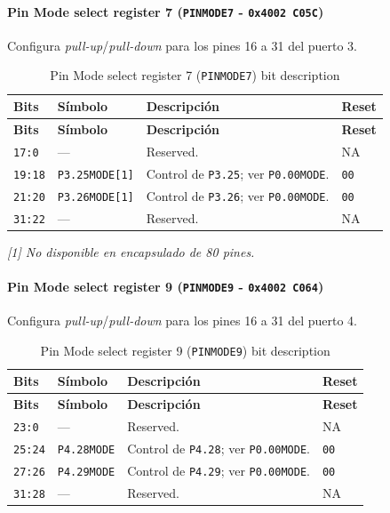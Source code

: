 \paragraph{Pin Mode select register 7 (\texttt{PINMODE7} - \texttt{0x4002 C05C})}
Configura \textit{pull-up}/\textit{pull-down} para los pines 16 a 31 del puerto 3.

\begin{longtable}{|>{\raggedright\arraybackslash}p{}|>{\raggedright\arraybackslash}p{}|>{\raggedright\arraybackslash}p{}|>{\centering\arraybackslash}p{}|}
\caption{Pin Mode select register 7 (\texttt{PINMODE7}) bit description}\\
\hline
\textbf{Bits} & \textbf{Símbolo} & \textbf{Descripción} & \textbf{Reset} \\
\hline
\endfirsthead
\hline
\textbf{Bits} & \textbf{Símbolo} & \textbf{Descripción} & \textbf{Reset} \\
\hline
\endhead
\texttt{17:0} & --- & Reserved. & NA \\
\hline
\texttt{19:18} & \texttt{P3.25MODE[1]} & Control de \texttt{P3.25}; ver \texttt{P0.00MODE}. & \texttt{00} \\
\hline
\texttt{21:20} & \texttt{P3.26MODE[1]} & Control de \texttt{P3.26}; ver \texttt{P0.00MODE}. & \texttt{00} \\
\hline
\texttt{31:22} & --- & Reserved. & NA \\
\hline
\end{longtable}
\noindent\textit{[1] No disponible en encapsulado de 80 pines.}

\paragraph{Pin Mode select register 9 (\texttt{PINMODE9} - \texttt{0x4002 C064})}
Configura \textit{pull-up}/\textit{pull-down} para los pines 16 a 31 del puerto 4.

\begin{longtable}{|>{\raggedright\arraybackslash}p{}|>{\raggedright\arraybackslash}p{}|>{\raggedright\arraybackslash}p{}|>{\centering\arraybackslash}p{}|}
\caption{Pin Mode select register 9 (\texttt{PINMODE9}) bit description}\\
\hline
\textbf{Bits} & \textbf{Símbolo} & \textbf{Descripción} & \textbf{Reset} \\
\hline
\endfirsthead
\hline
\textbf{Bits} & \textbf{Símbolo} & \textbf{Descripción} & \textbf{Reset} \\
\hline
\endhead
\texttt{23:0} & --- & Reserved. & NA \\
\hline
\texttt{25:24} & \texttt{P4.28MODE} & Control de \texttt{P4.28}; ver \texttt{P0.00MODE}. & \texttt{00} \\
\hline
\texttt{27:26} & \texttt{P4.29MODE} & Control de \texttt{P4.29}; ver \texttt{P0.00MODE}. & \texttt{00} \\
\hline
\texttt{31:28} & --- & Reserved. & NA \\
\hline
\end{longtable}


